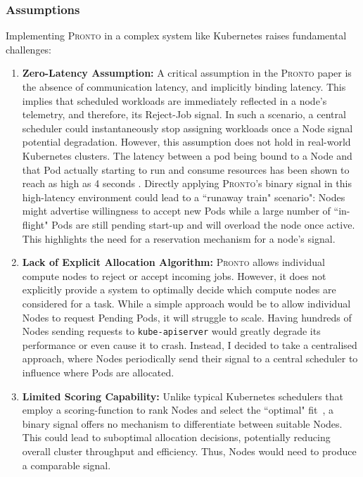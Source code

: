 \subsubsection{Assumptions}
Implementing \textsc{Pronto} in a complex system like Kubernetes raises
fundamental challenges:
\begin{enumerate}
    \item \textbf{Zero-Latency Assumption:} A critical assumption in the
        \textsc{Pronto} paper is the absence of communication latency, and
        implicitly binding latency. This implies that scheduled workloads are
        immediately reflected in a node's telemetry, and therefore, its
        Reject-Job signal. In such a scenario, a central scheduler could
        instantaneously stop assigning workloads once a Node signal potential
        degradation. However, this assumption does not hold in real-world
        Kubernetes clusters. The latency between a pod being bound to a Node and
        that Pod actually starting to run and consume resources has been shown
        to reach as high as 4 seconds \cite{qadeer_scaling_2022}. Directly
        applying \textsc{Pronto}'s binary signal in this high-latency
        environment could lead to a ``runaway train" scenario": Nodes might
        advertise willingness to accept new Pods while a large number of
        ``in-flight" Pods are still pending start-up and will overload the node
        once active. This highlights the need for a reservation mechanism for
        a node's signal.
    \item \textbf{Lack of Explicit Allocation Algorithm:} \textsc{Pronto} allows
        individual compute nodes to reject or accept incoming jobs. However, it
        does not explicitly provide a system to optimally decide which compute
        nodes are considered for a task. While a simple approach would be to allow
        individual Nodes to request Pending Pods, it will struggle to scale.
        Having hundreds of Nodes sending requests to \texttt{kube-apiserver}
        would greatly degrade its performance or even cause it to crash.
        Instead, I decided to take a centralised approach, where Nodes
        periodically send their signal to a central scheduler to influence where
        Pods are allocated.
    \item \textbf{Limited Scoring Capability:} Unlike typical Kubernetes
        schedulers that employ a scoring-function to rank Nodes and select the
        ``optimal" fit~\cite{kube-scheduler}, a binary signal offers no
        mechanism to differentiate between suitable Nodes. This could lead to
        suboptimal allocation decisions, potentially reducing overall cluster
        throughput and efficiency. Thus, Nodes would need to produce a
        comparable signal.
\end{enumerate}

